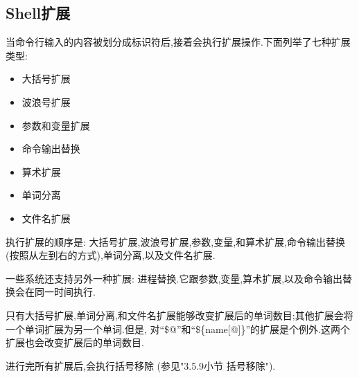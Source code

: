 \documentclass[draft,openany]{book}
\begin{document}
\begin{CJK}{UTF8}{gbsn}
    \section{Shell扩展}
    当命令行输入的内容被划分成标识符后,接着会执行扩展操作.下面列举了七种扩展类型:
    \begin{itemize}
        \item 大括号扩展
        \item 波浪号扩展
        \item 参数和变量扩展
        \item 命令输出替换
        \item 算术扩展
        \item 单词分离
        \item 文件名扩展
    \end{itemize}
    执行扩展的顺序是: 大括号扩展,波浪号扩展,参数,变量,和算术扩展,命令输出替换(按照从左到右的方式),单词分离,以及文件名扩展.\par
    一些系统还支持另外一种扩展: 进程替换.它跟参数,变量,算术扩展,以及命令输出替换会在同一时间执行.\par
    只有大括号扩展,单词分离,和文件名扩展能够改变扩展后的单词数目;其他扩展会将一个单词扩展为另一个单词.但是, 对``\$@''和``\$\{name[@]\}''的扩展是个例外.这两个扩展也会改变扩展后的单词数目.\par
    进行完所有扩展后,会执行括号移除 (参见"3.5.9小节 括号移除").


\end{CJK}
\end{document}
